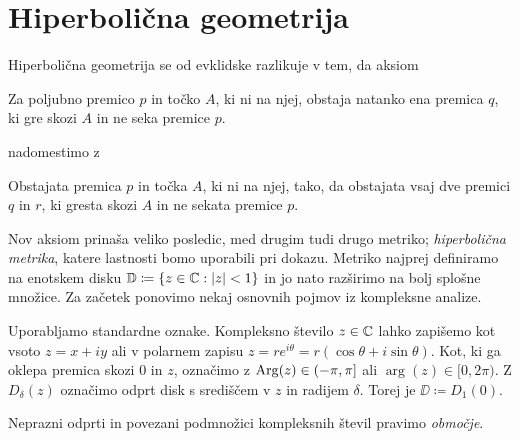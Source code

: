 \section{Hiperbolična geometrija} \label{sec:hipgeom}

Hiperbolična geometrija se od evklidske razlikuje v tem, da aksiom

\begin{aksiom}
    Za poljubno premico \(p\) in točko \(A\), ki ni na njej, obstaja natanko ena premica \(q\), ki gre skozi \(A\) in ne seka premice \(p\).
\end{aksiom}

\noindent nadomestimo z

\begin{aksiom}
    Obstajata premica \(p\) in točka \(A\), ki ni na njej, tako, da obstajata vsaj dve premici \(q\) in \(r\), ki gresta skozi \(A\) in ne sekata premice \(p\).
\end{aksiom}

\noindent Nov aksiom prinaša veliko posledic, med drugim tudi drugo metriko; \emph{hiperbolična metrika}, katere lastnosti bomo uporabili pri dokazu. Metriko najprej definiramo na enotskem disku \(\mathbb D \coloneq \left\{ z \in \mathbb C : |z| < 1 \right\}\) in jo nato razširimo na bolj splošne množice. Za začetek ponovimo nekaj osnovnih pojmov iz kompleksne analize.

Uporabljamo standardne oznake. Kompleksno število \(z \in \mathbb C\) lahko zapišemo kot vsoto \(z = x + i y\) ali v polarnem zapisu \(z = r e^{i \theta} = r (\cos \theta + i \sin \theta)\). Kot, ki ga oklepa premica skozi \(0\) in \(z\), označimo z \(\operatorname{Arg} (z) \in (- \pi, \pi]\) ali \(\arg (z) \in [0, 2 \pi)\). Z \(D_{\delta} (z)\) označimo odprt disk s središčem v \(z\) in radijem \(\delta\). Torej je \(\DD \coloneq D_1 (0)\).


\begin{definicija}
    Neprazni odprti in povezani podmnožici kompleksnih števil pravimo \emph{območje}.
\end{definicija}

